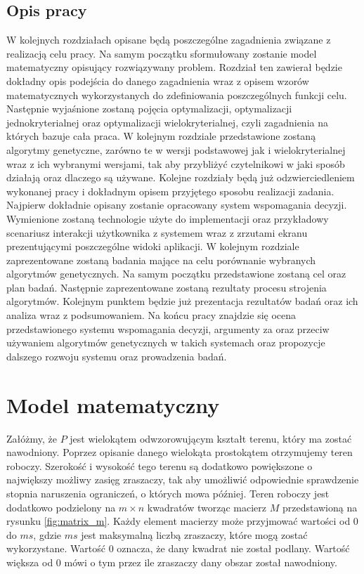 \documentclass[twoside]{iisthesis}
\begin{document}
\section{Opis pracy}
W kolejnych rozdziałach opisane będą poszczególne zagadnienia związane z realizacją celu pracy. Na samym początku sformułowany zostanie model matematyczny opisujący rozwiązywany problem. Rozdział ten zawierał będzie dokładny opis podejścia do danego zagadnienia wraz z opisem wzorów matematycznych wykorzystanych do zdefiniowania poszczególnych funkcji celu. Następnie wyjaśnione zostaną pojęcia optymalizacji, optymalizacji jednokryterialnej oraz optymalizacji wielokryterialnej, czyli zagadnienia na których bazuje cała praca. W kolejnym rozdziale przedstawione zostaną algorytmy genetyczne, zarówno te w wersji podstawowej jak i wielokryterialnej wraz z ich wybranymi wersjami, tak aby przybliżyć czytelnikowi w jaki sposób działają oraz dlaczego są używane. Kolejne rozdziały będą już odzwierciedleniem wykonanej pracy i dokładnym opisem przyjętego sposobu realizacji zadania. Najpierw dokładnie opisany zostanie opracowany system wspomagania decyzji. Wymienione zostaną technologie użyte do implementacji oraz przykładowy scenariusz interakcji użytkownika z systemem wraz z zrzutami ekranu prezentującymi poszczególne widoki aplikacji. W kolejnym rozdziale zaprezentowane zostaną badania mające na celu porównanie wybranych algorytmów genetycznych. Na samym początku przedstawione zostaną cel oraz plan badań. Następnie zaprezentowane zostaną rezultaty procesu strojenia algorytmów. Kolejnym punktem będzie już prezentacja rezultatów badań oraz ich analiza wraz z podsumowaniem. Na końcu pracy znajdzie się ocena przedstawionego systemu wspomagania decyzji, argumenty za oraz przeciw używaniem algorytmów genetycznych w takich systemach oraz propozycje dalszego rozwoju systemu oraz prowadzenia badań.

\chapter{Model matematyczny}
Załóżmy, że $P$ jest wielokątem odwzorowującym kształt terenu, który ma zostać nawodniony. Poprzez opisanie danego wielokąta prostokątem otrzymujemy teren roboczy. Szerokość i wysokość tego terenu są dodatkowo powiększone o największy możliwy zasięg zraszaczy, tak aby umożliwić odpowiednie sprawdzenie stopnia naruszenia ograniczeń, o których mowa później. Teren roboczy jest dodatkowo podzielony na $m \times n$ kwadratów tworząc macierz $M$ przedstawioną na rysunku \eqref{fig:matrix_m}. Każdy element macierzy może przyjmować wartości od 0 do $ms$, gdzie $ms$ jest maksymalną liczbą zraszaczy, które mogą zostać wykorzystane. Wartość 0 oznacza, że dany kwadrat nie został podlany. Wartość większa od 0 mówi o tym przez ile zraszaczy dany obszar został nawodniony.
\end{document}

